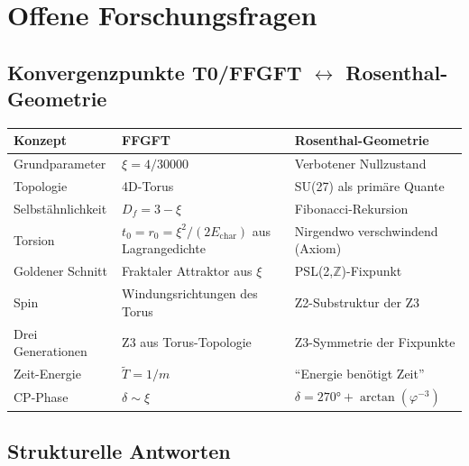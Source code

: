 \documentclass[12pt, a4paper]{article}
\newcommand{\xipar}{\xi}
\newcommand{\Tfield}{\tilde{T}}
\newcommand{\Dfrak}{D_f}
\begin{document}
\section{Offene Forschungsfragen}

\subsection{Konvergenzpunkte T0/FFGFT $\leftrightarrow$ Rosenthal-Geometrie}

\begin{center}
\begin{tabular}{@{}lll@{}}
\toprule
Konzept & FFGFT & Rosenthal-Geometrie \\
\midrule
Grundparameter & $\xipar = 4/30000$ & Verbotener Nullzustand \\
Topologie & 4D-Torus & SU(27) als primäre Quante \\
Selbstähnlichkeit & $\Dfrak = 3 - \xipar$ & Fibonacci-Rekursion \\
Torsion & $t_0 = r_0 = \xipar^2/(2E_{\text{char}})$ aus Lagrangedichte & Nirgendwo verschwindend (Axiom) \\
Goldener Schnitt & Fraktaler Attraktor aus $\xipar$ & PSL(2,$\mathbb{Z}$)-Fixpunkt \\
Spin & Windungsrichtungen des Torus & Z2-Substruktur der Z3 \\
Drei Generationen & Z3 aus Torus-Topologie & Z3-Symmetrie der Fixpunkte \\
Zeit-Energie & $\Tfield = 1/m$ & ``Energie benötigt Zeit'' \\
CP-Phase & $\delta \sim \xipar$ & $\delta = 270° + \arctan(\varphi^{-3})$ \\
\bottomrule
\end{tabular}
\end{center}

\subsection{Strukturelle Antworten}
\end{document}
